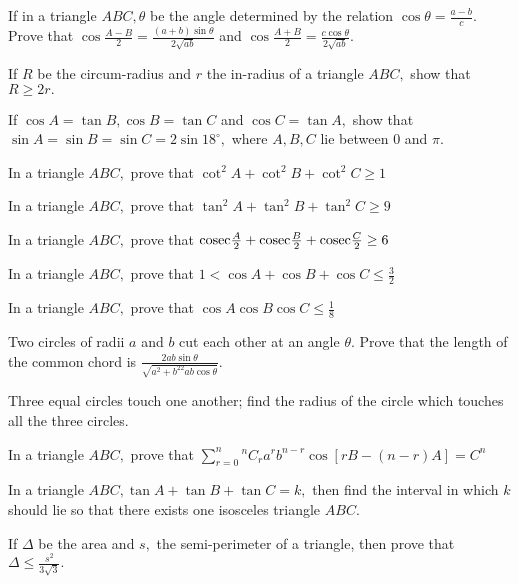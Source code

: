 \item If in a triangle $ABC, \theta$ be the angle determined by the relation $\cos\theta = \frac{a - b}{c}.$ Prove that
   $\cos\frac{A - B}{2} = \frac{(a + b)\sin\theta}{2\sqrt{ab}}$ and $\cos \frac{A+B}{2} =
   \frac{c\cos\theta}{2\sqrt{ab}}.$

\item If $R$ be the circum-radius and $r$ the in-radius of a triangle $ABC,$ show that $R\geq 2r.$

\item If $\cos A = \tan B, \cos B = \tan C$ and $\cos C = \tan A,$ show that $\sin A = \sin B = \sin C = 2\sin
   18^\circ,$ where $A, B, C$ lie between $0$ and $\pi.$

\item In a triangle $ABC,$ prove that $\cot^2A + \cot^2B + \cot^2C\geq 1$

\item In a triangle $ABC,$ prove that $\tan^2A + \tan^2B + \tan^2C \geq 9$

\item In a triangle $ABC,$ prove that ${\rm cosec}\frac{A}{2} + {\rm cosec}\frac{B}{2} + {\rm cosec}\frac{C}{2} \geq 6$

\item In a triangle $ABC,$ prove that $1 < \cos A + \cos B + \cos C \leq \frac{3}{2}$

\item In a triangle $ABC,$ prove that $\cos A\cos B\cos C \leq \frac{1}{8}$

\item Two circles of radii $a$ and $b$ cut each other at an angle $\theta.$ Prove that the length of the common
   chord is $\frac{2ab\sin\theta}{\sqrt{a^2 + b^22ab\cos\theta}}.$

\item Three equal circles touch one another; find the radius of the circle which touches all the three circles.

\item In a triangle $ABC,$ prove that $\sum_{r=0}^n{}^nC_ra^rb^{n - r}\cos[rB - (n - r)A] = C^n$

\item In a triangle $ABC, \tan A + \tan B + \tan C = k,$ then find the interval in which $k$ should lie so that there
   exists one isosceles triangle $ABC.$

\item If $\Delta$ be the area and $s,$ the semi-perimeter of a triangle, then prove that $\Delta \leq
   \frac{s^2}{3\sqrt{3}}.$

